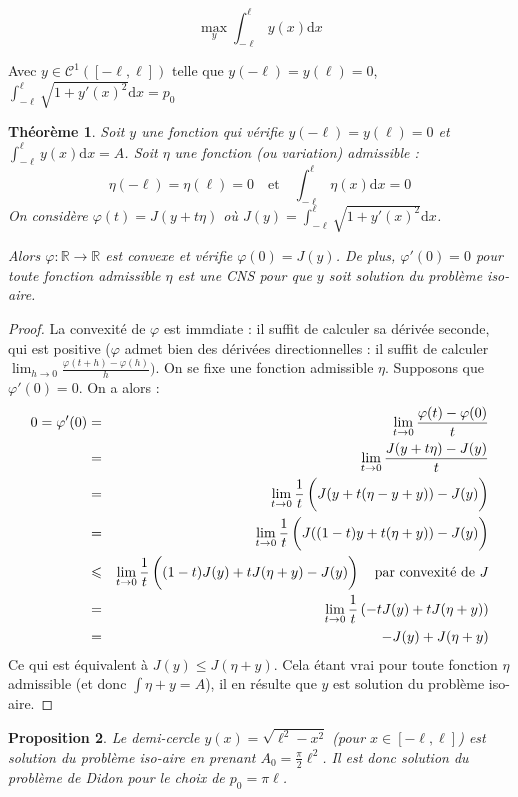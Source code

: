 \documentclass[10pt,a4paper]{article}
\newcommand{\R}{\mathbb{R}}
\newcommand{\C}{\mathcal{C}}
\renewcommand{\d}{\mathrm{d}}
\renewcommand{\phi}{\varphi}
\theoremstyle{plain}
\newtheorem{thm}{Théorème}[section]
\newtheorem{prop}[thm]{Proposition}
\theoremstyle{definition}
\begin{document}
\[\max_{y}\int_{-\ell}^\ell y(x)\d x\]

Avec $y\in\C^1([-\ell,\ell])$ telle que $y(-\ell)=y(\ell)=0$, $\int_{-\ell}^\ell\sqrt{1+y'(x)^2}\d x=p_0$





\begin{thm}
Soit $y$ une fonction qui vérifie $y(-\ell)=y(\ell)=0$ et $\displaystyle\int_{-\ell}^{\ell}y(x)\d x=A$. Soit $\eta$ une fonction (ou \emph{variation}) \emph{admissible} :
\[\eta(-\ell)=\eta(\ell)=0\quad \text{et}\quad\int_{-\ell}^{\ell}\eta(x)\d x=0\]
On considère $\phi(t)=J(y+t\eta)$ où $J(y)=\displaystyle\int_{-\ell}^{\ell}\sqrt{1+y'(x)^2}\d x$.

Alors $\phi\colon\R\to\R$ est convexe et vérifie $\phi(0)=J(y)$. De plus, $\phi'(0)=0$ pour toute fonction admissible $\eta$ est une CNS pour que $y$ soit solution du problème iso-aire.
\end{thm}


\begin{proof}
La convexité de $\phi$ est immdiate : il suffit de calculer sa dérivée seconde, qui est positive ($\phi$ admet bien des dérivées directionnelles : il suffit de calculer $\lim_{h\to 0}\frac{\phi(t+h)-\phi(h)}{h})$.
On se fixe une fonction admissible $\eta$. Supposons que $\phi'(0)=0$. On a alors :
\begin{eqnarray*}
0=\phi'(0) &=& \lim_{t\to 0}\dfrac{\phi(t)-\phi(0)}{t}\\
			&=& \lim_{t\to0}\frac{J(y+t\eta)-J(y)}{t}\\
			&=& \lim_{t\to0}\frac{1}{t}\left(\vphantom{\frac{1}{2}}J(y+t(\eta-y+y))-J(y)\right)\\
			&=& \lim_{t\to0}\frac{1}{t}\left(\vphantom{\frac{1}{2}}J((1-t)y+t(\eta+y))-J(y)\right)\\
			&\leqslant&\lim_{t\to0}\frac{1}{t}\left(\vphantom{\frac{1}{2}}(1-t)J(y)+tJ(\eta+y)-J(y)\right)\quad\text{par convexité de $J$}\\
			&=& \lim_{t\to0}\frac{1}{t}\left(-tJ(y)+tJ(\eta+y)\right)\\
			&=& -J(y)+J(\eta+y)
\end{eqnarray*}
Ce qui est équivalent à $J(y)\leqslant J(\eta+y)$. Cela étant vrai pour toute fonction $\eta$ admissible (et donc $\int\eta+y=A$), il en résulte que $y$ est solution du problème iso-aire. 
\end{proof}




\begin{prop}
\label{prop:didon}
Le demi-cercle $y(x)=\sqrt{\ell^2-x^2}$ (pour $x\in[-\ell,\ell]$) est solution du problème iso-aire en prenant $A_0=\frac{\pi}{2}\ell^2$. Il est donc solution du problème de Didon pour le choix de $p_0=\pi \ell$.
\end{prop}
\end{document}
